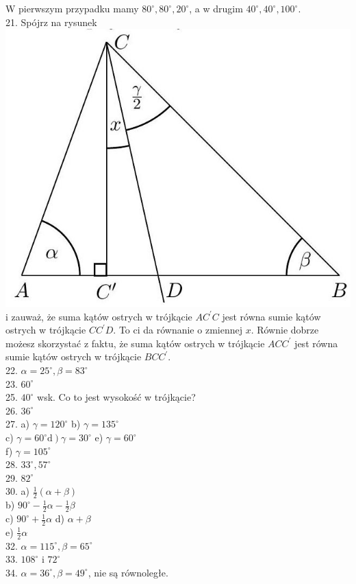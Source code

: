 \documentclass[10pt]{article}
\begin{document}
W pierwszym przypadku mamy \(80^{\circ}, 80^{\circ}, 20^{\circ}\), a w drugim \(40^{\circ}, 40^{\circ}, 100^{\circ}\).\\
21. Spójrz na rysunek\\
\includegraphics[max width=\textwidth, center]{2024_11_21_71f62bd117d375398909g-027}\\
i zauważ, że suma kątów ostrych w trójkącie \(A C^{\prime} C\) jest równa sumie kątów ostrych w trójkącie \(C C^{\prime} D\). To ci da równanie o zmiennej \(x\). Równie dobrze możesz skorzystać z faktu, że suma kątów ostrych w trójkącie \(A C C^{\prime}\) jest równa sumie kątów ostrych w trójkącie \(B C C^{\prime}\).\\
22. \(\alpha=25^{\circ}, \beta=83^{\circ}\)\\
23. \(60^{\circ}\)\\
25. \(40^{\circ}\) wsk. Co to jest wysokość w trójkącie?\\
26. \(36^{\circ}\)\\
27. a) \(\gamma=120^{\circ}\) b) \(\gamma=135^{\circ}\)\\
c) \(\left.\gamma=60^{\circ} \mathrm{d}\right) \gamma=30^{\circ}\) e) \(\gamma=60^{\circ}\)\\
f) \(\gamma=105^{\circ}\)\\
28. \(33^{\circ}, 57^{\circ}\)\\
29. \(82^{\circ}\)\\
30. a) \(\frac{1}{2}(\alpha+\beta)\)\\
b) \(90^{\circ}-\frac{1}{2} \alpha-\frac{1}{2} \beta\)\\
c) \(90^{\circ}+\frac{1}{2} \alpha\) d) \(\alpha+\beta\)\\
e) \(\frac{1}{2} \alpha\)\\
32. \(\alpha=115^{\circ}, \beta=65^{\circ}\)\\
33. \(108^{\circ}\) i \(72^{\circ}\)\\
34. \(\alpha=36^{\circ}, \beta=49^{\circ}\), nie są równoległe.
\end{document}

